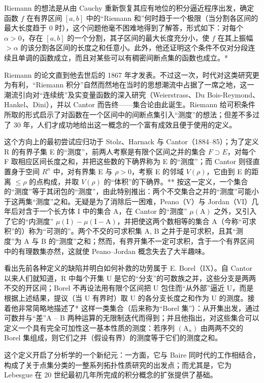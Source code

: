 Riemann 的想法是从由 Cauchy 重新恢复其应有地位的积分逼近程序出发，确定函数 \(f\) 在有界区间 \([a, b]\) 中的“Riemann 和”何时趋于一个极限（当分割各区间的最大长度趋于 0 时），这个问题他毫不困难地得到了解答，形式如下：对每个 \(\alpha > 0\)，存在 \([a, b]\) 的一个分割，其子区间的最大长度充分小，使 \(f\) 在其上振幅 \(>\alpha\) 的该分割各区间的长度之和任意小。此外，他还证明这个条件不仅对分段连续且单调的函数成立，而且对某些可以有稠密间断点集的函数也成立。*

Riemann 的论文直到他去世后的 1867 年才发表。不过这一次，时代对这类研究更为有利，“Riemann 积分”自然而然地在当时的思想潮流中占据了一席之地，这一潮流引向对“连续统”及实变量函数的深入研究（Weierstrass、Du Bois-Reymond、Hankel、Dini），并以 Cantor 而告终——集合论由此诞生。Riemann 给可积条件所取的形式启示了对函数在一个区间中的间断点集引入“测度”的想法；但差不多过了 30 年，人们才成功地给出这一概念的一个富有成效且便于使用的定义。

这个方向上的最初尝试应归功于 Stolz、Harnack 与 Cantor（1884--85）；为了定义 R 的有界子集 E 的“测度”，前两人考察是有限个区间之并的集合 \(F \supset E\)，对每个 F 取相应区间长度之和，并把这些数的下确界称为 E 的“测度”；而 Cantor 则径直置身于空间 \(R^{n}\) 中，对有界集 E 与 \(\rho > 0\)，考察 E 的邻域 \(V(\rho)\)，它由到 E 的距离 \(\leqslant \rho\) 的点构成，并取 \(V(\rho)\) 的“体积”的下确界。** 按这一定义，一个集合的“测度”等于其闭包的“测度”，由此特别推出：两个不交集合之并的“测度”可能小于这两集“测度”之和。无疑是为了消除后一困难，Peano（V）与 Jordan（VI）几年后对含于一个长方体 I 中的集合 A，在 Cantor 的“测度” \(\mu(\mathrm{A})\) 之外，又引入了它的“内测度” \(\mu(\mathrm{I}) - \mu(\mathrm{I} - \mathrm{A})\)，并把使这两个数相等的集合 A（今称“可求积”的）称为“可测的”。两个不交的可求积集 A, B 之并于是可求积，且其“测度”为 A 与 B 的“测度”之和；然而，有界开集不一定可求积，含于一个有界区间中的有理数集亦然，这就使 Peano--Jordan 概念失去了大半趣味。

看出先前各种定义的缺陷并明白如何补救的功劳属于 E. Borel（IX）。自 Cantor 以来人们就知道，R 中每个开集 U 是它的“分支”的可数族之并，这些分支是两两不交的开区间；Borel 不再设法用有限个区间把 U 包住而“从外部”逼近 U，而是根据上述结果，提议（当 U 有界时）取 U 的各分支长度之和作为 U 的测度。接着他非常简略地描述了* 这样一类集合（后来称为“Borel 集”）：从开集出发，通过可数并与“差”A -- B 两种运算的无限制迭代而得到；并且他指出，对这些集合可以定义一个具有完全可加性这一基本性质的测度：若序列 \((\mathrm{A}_{n})\) 由两两不交的 Borel 集组成，则它们之并（假设有界）的测度等于它们的测度之和。

这个定义开启了分析学的一个新纪元：一方面，它与 Baire 同时代的工作相结合，构成了关于点集分类的一整系列拓扑性质研究的出发点；而尤其是，它为 Lebesgue 在 20 世纪最初几年所完成的积分概念的扩张提供了基础。

